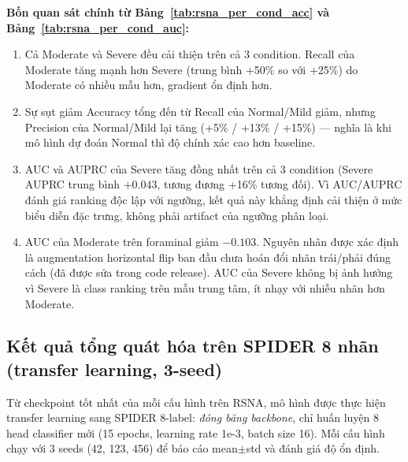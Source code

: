 \textbf{Bốn quan sát chính từ Bảng~\ref{tab:rsna_per_cond_acc} và Bảng~\ref{tab:rsna_per_cond_auc}:}
\begin{enumerate}
    \item Cả Moderate và Severe đều cải thiện trên cả 3 condition. Recall của Moderate tăng mạnh hơn Severe (trung bình +50\% so với +25\%) do Moderate có nhiều mẫu hơn, gradient ổn định hơn.
    \item Sự sụt giảm Accuracy tổng đến từ Recall của Normal/Mild giảm, nhưng Precision của Normal/Mild lại tăng (+5\% / +13\% / +15\%) --- nghĩa là khi mô hình dự đoán Normal thì độ chính xác cao hơn baseline.
    \item AUC và AUPRC của Severe tăng đồng nhất trên cả 3 condition (Severe AUPRC trung bình $+0.043$, tương đương +16\% tương đối). Vì AUC/AUPRC đánh giá ranking độc lập với ngưỡng, kết quả này khẳng định cải thiện ở mức biểu diễn đặc trưng, không phải artifact của ngưỡng phân loại.
    \item AUC của Moderate trên foraminal giảm $-0.103$. Nguyên nhân được xác định là augmentation horizontal flip ban đầu chưa hoán đổi nhãn trái/phải đúng cách (đã được sửa trong code release). AUC của Severe không bị ảnh hưởng vì Severe là class ranking trên mẫu trung tâm, ít nhạy với nhiễu nhãn hơn Moderate.
\end{enumerate}

\subsection{Kết quả tổng quát hóa trên SPIDER 8 nhãn (transfer learning, 3-seed)}
Từ checkpoint tốt nhất của mỗi cấu hình trên RSNA, mô hình được thực hiện transfer learning sang SPIDER 8-label: \emph{đóng băng backbone}, chỉ huấn luyện 8 head classifier mới (15 epochs, learning rate 1e-3, batch size 16). Mỗi cấu hình chạy với 3 seeds (42, 123, 456) để báo cáo mean$\pm$std và đánh giá độ ổn định.

